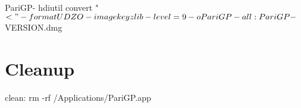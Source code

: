 \documentclass[article]{pastex}
\begin{document}
\begin{code}[make]

PariGP-%
	hdiutil convert "$<" -format UDZO -imagekey zlib-level=9 -o PariGP-%


all: PariGP-${VERSION}.dmg

\end{code}


\section{Cleanup}

\begin{code}[make]
clean:
	rm -rf /Applications/PariGP.app
  
\end{code}
\end{document}
